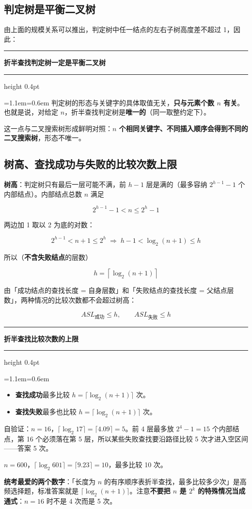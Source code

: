 \documentclass[11pt,openany,UTF8]{ctexbook}
\newcommand{\callouthead}[2]{%
  \par\addvspace{7pt}\noindent
  {\color{#1}\rule[-0.15em]{3pt}{1.05em}}\hspace{0.5em}%
  {\bfseries\color{#1}#2}\par\nobreak\vspace{-0.35em}%
  {\color{rulesep}\hrule height 0.4pt}\nobreak\vspace{0.45em}%
  \begingroup\small\setlength{\parindent}{0pt}%
  \leftskip=1.1em\rightskip=0.6em\noindent\ignorespaces}
\newcommand{\calloutend}{\par\endgroup\addvspace{7pt}}
\newenvironment{callkey}[1]{\callouthead{keybar}{#1}}{\calloutend}
\begin{document}
\subsection{判定树是平衡二叉树}

由上面的规模关系可以推出，判定树中任一结点的左右子树高度差不超过 1，因此：

\begin{callkey}{折半查找判定树一定是平衡二叉树}
判定树的形态与关键字的具体取值无关，\textbf{只与元素个数 $n$ 有关}。也就是说，对给定 $n$，折半查找判定树是\textbf{唯一的}（同一取整约定下）。

这一点与二叉搜索树形成鲜明对照：\textbf{$n$ 个相同关键字、不同插入顺序会得到不同的二叉搜索树}，形态不唯一。

\end{callkey}

\subsection{树高、查找成功与失败的比较次数上限}

\textbf{树高}：判定树只有最后一层可能不满，前 $h-1$ 层是满的（最多容纳 $2^{h-1}-1$ 个内部结点）。内部结点总数 $n$ 满足

\[2^{h-1}-1<n\le 2^{h}-1\]

两边加 1 取以 2 为底的对数：

\[2^{h-1}<n+1\le 2^{h}\;\Longrightarrow\; h-1<\log_2(n+1)\le h\]

所以（\textbf{不含失败结点}的层数）

\[\boxed{h=\left\lceil \log_2(n+1)\right\rceil }\]

由「成功结点的查找长度 = 自身层数」和「失败结点的查找长度 = 父结点层数」，两种情况的比较次数都不会超过树高：

\[ASL_{成功}\le h,\qquad ASL_{失败}\le h\]

\begin{callkey}{折半查找比较次数的上限}
\begin{itemize}
\item \textbf{查找成功}最多比较 $h=\lceil\log_2(n+1)\rceil$ 次。
\item \textbf{查找失败}最多也比较 $h=\lceil\log_2(n+1)\rceil$ 次。
\end{itemize}
自验证：$n=16$，$\lceil\log_2 17\rceil=\lceil 4.09\rceil=5$。前 4 层最多放 $2^4-1=15$ 个内部结点，第 16 个必须落在第 5 层，所以某些失败查找要沿路径比较 5 次才进入空区间——答案 5 次。

$n=600$，$\lceil\log_2 601\rceil=\lceil 9.23\rceil=10$，最多比较 10 次。

\textbf{统考最爱的两个数字}：「长度为 $n$ 的有序顺序表折半查找，最多比较多少次」是高频选择题，标准答案就是 $\lceil \log_2(n+1)\rceil$。注意\textbf{不要把 $n$ 是 $2^k$ 的特殊情况当成通式}：$n=16$ 时不是 4 次而是 5 次。

\end{callkey}
\end{document}
